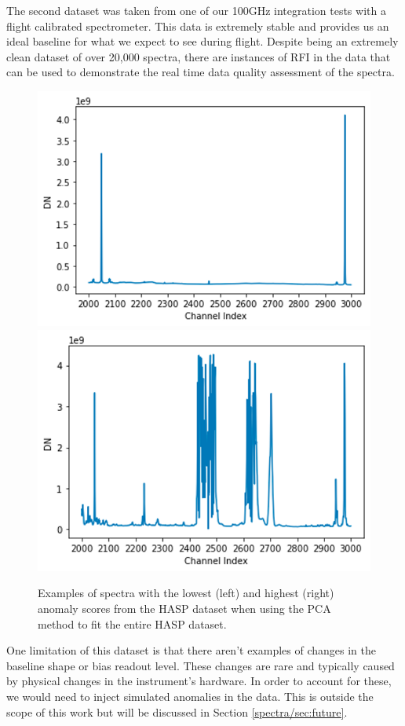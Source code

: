 The second dataset was taken from one of our 100GHz integration tests with a flight calibrated spectrometer. 
This data is extremely stable and provides us an ideal baseline for what we expect to see during flight.
Despite being an extremely clean dataset of over 20,000 spectra, there are instances of RFI in the data that can be used to demonstrate the real time data quality assessment of the spectra. 

\begin{figure}
    \centering
    \includegraphics[width=0.49\linewidth]{figs/spectra/hasp1.png}
    \includegraphics[width=0.49\linewidth]{figs/spectra/hasp2.png}
    \caption[The Least and Most Novel Spectra in the HASP Data]{Examples of spectra with the lowest (left) and highest (right) anomaly scores from the HASP dataset when using the PCA method to fit the entire HASP dataset.}
    \label{spectra/fig:hasp}
\end{figure}

One limitation of this dataset is that there aren't examples of changes in the baseline shape or bias readout level. 
These changes are rare and typically caused by physical changes in the instrument's hardware. 
In order to account for these, we would need to inject simulated anomalies in the data.
This is outside the scope of this work but will be discussed in Section \ref{spectra/sec:future}.

